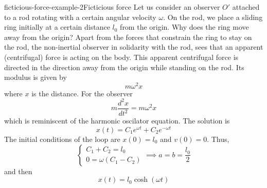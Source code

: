 \documentclass[preview]{standalone}
\begin{document}
\begin{snippetexample}{ficticious-force-example-2}{Ficticious force}
    Let us consider an observer \(O'\) attached to a rod rotating with a certain angular velocity \(\omega\).
    On the rod, we place a sliding ring initially at a certain distance
    \(l_0\) from the origin.
    Why does the ring move away from the origin?
    Apart from the forces that constrain the ring to stay on the rod, the non-inertial observer
    in solidarity with the rod, sees that an apparent (centrifugal) force is acting on the body.
    This apparent centrifugal force is directed in the direction away from the origin
    while standing on the rod. Its modulus is given by
    \[
        m\omega^2 x
    \]
    where \(x\) is the distance.
    For the observer
    \[
        m \frac{d^2x}{dt^2} = m\omega^2 x
    \]
    which is reminiscent of the harmonic oscilator equation. The solution is
    \[
        x(t) = C_1e^{\omega t} + C_2e^{-\omega t}
    \]
    The initial conditions of the loop are \(x(0)=l_0\)
    and \(v(0) = 0\).
    Thus,
    \[
        \begin{cases}
            C_1 + C_2 = l_0 \\
            0 = \omega(C_1 - C_2)
        \end{cases}
        \implies a = b = \frac{l_0}{2}
    \]
    and then
    \[
        x(t) = l_0 \cosh(\omega t)
    \]
\end{snippetexample}
\end{document}
